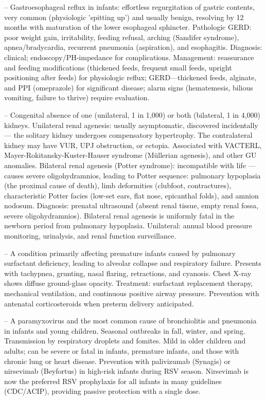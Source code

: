 -- Gastroesophageal reflux in infants: effortless regurgitation of gastric contents, very common (physiologic 'spitting up') and usually benign, resolving by 12 months with maturation of the lower esophageal sphincter. Pathologic GERD: poor weight gain, irritability, feeding refusal, arching (Sandifer syndrome), apnea/bradycardia, recurrent pneumonia (aspiration), and esophagitis. Diagnosis: clinical; endoscopy/PH-impedance for complications. Management: reassurance and feeding modifications (thickened feeds, frequent small feeds, upright positioning after feeds) for physiologic reflux; GERD—thickened feeds, alginate, and PPI (omeprazole) for significant disease; alarm signs (hematemesis, bilious vomiting, failure to thrive) require evaluation.

-- Congenital absence of one (unilateral, 1 in 1,000) or both (bilateral, 1 in 4,000) kidneys. Unilateral renal agenesis: usually asymptomatic, discovered incidentally — the solitary kidney undergoes compensatory hypertrophy. The contralateral kidney may have VUR, UPJ obstruction, or ectopia. Associated with VACTERL, Mayer-Rokitansky-Kuster-Hauser syndrome (Müllerian agenesis), and other GU anomalies. Bilateral renal agenesis (Potter syndrome): incompatible with life — causes severe oligohydramnios, leading to Potter sequence: pulmonary hypoplasia (the proximal cause of death), limb deformities (clubfoot, contractures), characteristic Potter facies (low-set ears, flat nose, epicanthal folds), and amnion nodosum. Diagnosis: prenatal ultrasound (absent renal tissue, empty renal fossa, severe oligohydramnios). Bilateral renal agenesis is uniformly fatal in the newborn period from pulmonary hypoplasia. Unilateral: annual blood pressure monitoring, urinalysis, and renal function surveillance.

-- A condition primarily affecting premature infants caused by pulmonary surfactant deficiency, leading to alveolar collapse and respiratory failure. Presents with tachypnea, grunting, nasal flaring, retractions, and cyanosis. Chest X-ray shows diffuse ground-glass opacity. Treatment: surfactant replacement therapy, mechanical ventilation, and continuous positive airway pressure. Prevention with antenatal corticosteroids when preterm delivery anticipated.

-- A paramyxovirus and the most common cause of bronchiolitis and pneumonia in infants and young children. Seasonal outbreaks in fall, winter, and spring. Transmission by respiratory droplets and fomites. Mild in older children and adults; can be severe or fatal in infants, premature infants, and those with chronic lung or heart disease. Prevention with palivizumab (Synagis) or nirsevimab (Beyfortus) in high-risk infants during RSV season. Nirsevimab is now the preferred RSV prophylaxis for all infants in many guidelines (CDC/ACIP), providing passive protection with a single dose.

